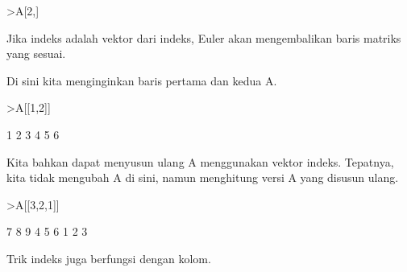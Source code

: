 \documentclass{article}
\begin{document}
\begin{eulernotebook}
\begin{eulercomment}
\begin{eulercomment}
\begin{eulercomment}
\begin{eulercomment}
\begin{eulercomment}
\begin{eulercomment}
\begin{eulerprompt}
>A[2,]
\end{eulerprompt}
\begin{euleroutput}
  [4,  5,  6]
\end{euleroutput}
\begin{eulercomment}
Jika indeks adalah vektor dari indeks, Euler akan mengembalikan baris
matriks yang sesuai.

Di sini kita menginginkan baris pertama dan kedua A.
\end{eulercomment}
\begin{eulerprompt}
>A[[1,2]]
\end{eulerprompt}
\begin{euleroutput}
              1             2             3 
              4             5             6 
\end{euleroutput}
\begin{eulercomment}
Kita bahkan dapat menyusun ulang A menggunakan vektor indeks.
Tepatnya, kita tidak mengubah A di sini, namun menghitung versi A yang
disusun ulang.
\end{eulercomment}
\begin{eulerprompt}
>A[[3,2,1]]
\end{eulerprompt}
\begin{euleroutput}
              7             8             9 
              4             5             6 
              1             2             3 
\end{euleroutput}
\begin{eulercomment}
Trik indeks juga berfungsi dengan kolom.


\end{eulercomment}
\end{eulercomment}
\end{eulercomment}
\end{eulercomment}
\end{eulercomment}
\end{eulercomment}
\end{eulercomment}
\end{eulernotebook}
\end{document}
